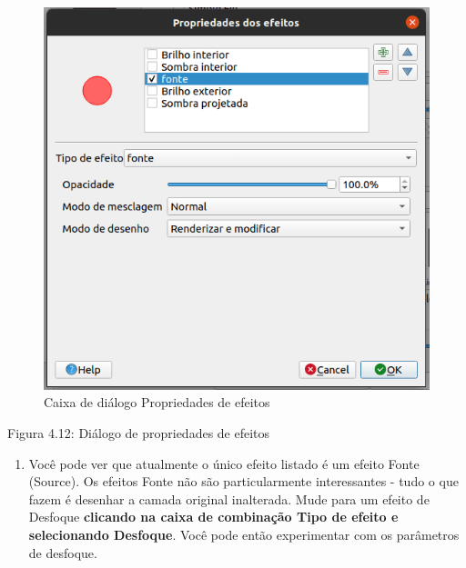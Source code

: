 \documentclass[
]{krantz}
\providecommand{\tightlist}{%
  \setlength{\itemsep}{0pt}\setlength{\parskip}{0pt}}
\begin{document}
\begin{figure}
\centering
\includegraphics{media/modulo4/new-effects-dialog.png}
\caption{Caixa de diálogo Propriedades de efeitos}
\end{figure}

Figura 4.12: Diálogo de propriedades de efeitos

\begin{enumerate}
\def\labelenumi{\arabic{enumi}.}
\setcounter{enumi}{3}
\tightlist
\item
  Você pode ver que atualmente o único efeito listado é um efeito Fonte (Source). Os efeitos Fonte não são particularmente interessantes - tudo o que fazem é desenhar a camada original inalterada. Mude para um efeito de Desfoque \textbf{clicando na caixa de combinação Tipo de efeito e selecionando Desfoque}. Você pode então experimentar com os parâmetros de desfoque.
\end{enumerate}
\end{document}

